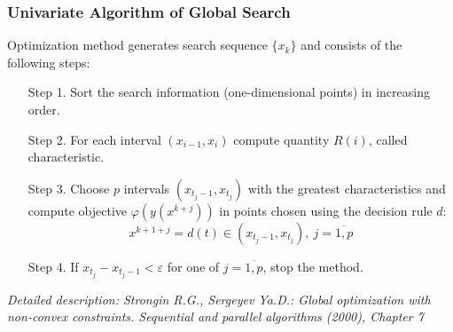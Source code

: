 \documentclass[aspectratio=1610]{beamer}
\begin{document}
\begin{frame}
  \frametitle{Univariate Algorithm of Global Search}
  Optimization method generates search sequence \(\{x_k\}\) and consists of the following steps:
  \begin{enumerate}
    \setlength{\itemindent}{.1in}
    \item[Step 1.] Sort the search information (one-dimensional points) in increasing order.
    \item[Step 2.] For each interval \((x_{i-1}, x_i)\) compute quantity \(R(i)\), called characteristic.
    \item[Step 3.] Choose \(p\) intervals \((x_{t_j-1}, x_{t_j})\) with the greatest characteristics and
    compute objective \(\varphi(y(x^{k+j}))\) in points chosen using the decision rule \(d\):
    \begin{displaymath}
      x^{k+1+j}=d(t)\in (x_{t_j-1}, x_{t_j}),\:j=\overline{1,p}
    \end{displaymath}
    \item[Step 4.] If \(x_{t_j}-x_{t_j-1}<\varepsilon\) for one of \(j=\overline{1,p}\), stop the method.
  \end{enumerate}
  \textit{\footnotesize	{Detailed description: Strongin R.G., Sergeyev Ya.D.: Global optimization with non-convex constraints. Sequential and parallel algorithms (2000), Chapter 7}}
\end{frame}
\end{document}
